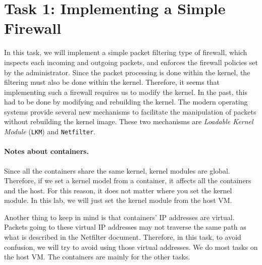 %


\section{Task 1: Implementing a Simple Firewall} 


In this task, we will implement a simple packet filtering 
type of firewall, which 
inspects each incoming and outgoing packets, and enforces the firewall policies 
set by the administrator. Since the packet 
processing is done within the kernel, the filtering must also be 
done within the kernel. Therefore, it seems that implementing such
a firewall requires us to modify the \linux kernel. In the past, 
this had to be done by modifying and rebuilding 
the kernel. The modern \linux 
operating systems provide several new mechanisms 
to facilitate the manipulation of packets without rebuilding
the kernel image. These two mechanisms are 
\textit{Loadable Kernel Module} (\texttt{LKM}) and \texttt{Netfilter}.



\paragraph{Notes about containers.}
Since all the containers share the same kernel, kernel modules are global. 
Therefore, if we set a kernel model from a container,
it affects all the containers and the host. For this reason, 
it does not matter where you set the kernel module. In this lab,
we will just set the kernel module from the host VM.

Another thing to keep in mind is that containers' IP addresses are virtual. 
Packets going to these virtual IP addresses may not 
traverse the same path as what is described in the Netfilter document. 
Therefore, in this task, to avoid confusion, we will try to avoid using those virtual addresses. 
We do most tasks on the host VM. The containers are mainly for the other tasks. 


